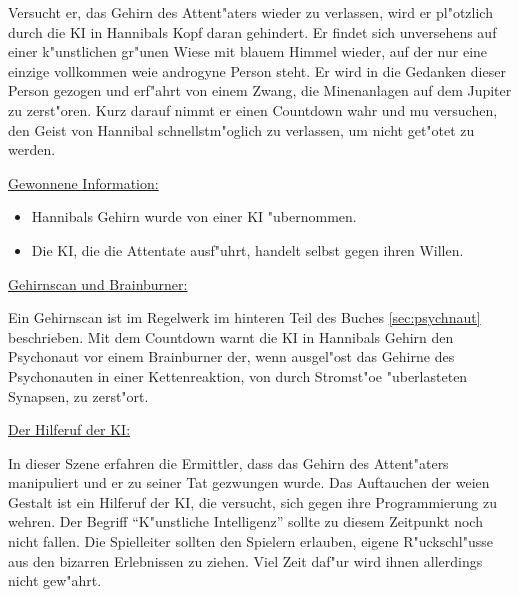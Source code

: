 Versucht er, das Gehirn des Attent"aters wieder zu verlassen, wird er pl"otzlich durch die KI in Hannibals Kopf daran gehindert. Er findet sich unversehens auf einer k"unstlichen gr"unen Wiese mit blauem Himmel wieder, auf der nur eine einzige vollkommen wei\3e androgyne Person steht. Er wird in die Gedanken dieser Person gezogen und erf"ahrt von einem Zwang, die Minenanlagen auf dem Jupiter zu zerst"oren. Kurz darauf nimmt er einen Countdown wahr und mu\3 versuchen, den Geist von Hannibal schnellstm"oglich zu verlassen, um nicht get"otet zu werden.

\begin{remarks}
	\underline{Gewonnene Information:}

	\begin{itemize}
		\item Hannibals Gehirn wurde von einer KI "ubernommen.
		\item  Die KI, die die Attentate ausf"uhrt, handelt selbst gegen ihren Willen.
	\end{itemize}

	\underline{Gehirnscan und Brainburner:}

	Ein Gehirnscan ist im Regelwerk im hinteren Teil des Buches \cref{sec:psychnaut} beschrieben. Mit dem Countdown warnt die KI in Hannibals Gehirn den Psychonaut vor einem Brainburner der, wenn ausgel"ost das Gehirne des Psychonauten in einer Kettenreaktion, von durch Stromst"o\3e "uberlasteten Synapsen, zu zerst"ort.

	\underline{Der Hilferuf der KI:}

	In dieser Szene erfahren die Ermittler, dass das Gehirn des Attent"aters manipuliert und er zu seiner Tat gezwungen wurde. Das Auftauchen der wei\3en Gestalt ist ein Hilferuf der KI, die versucht, sich gegen ihre Programmierung zu wehren. Der Begriff ``K"unstliche Intelligenz'' sollte zu diesem Zeitpunkt noch nicht fallen. Die Spielleiter sollten den Spielern erlauben, eigene R"uckschl"usse aus den bizarren Erlebnissen zu ziehen. Viel Zeit daf"ur wird ihnen allerdings nicht gew"ahrt.
\end{remarks}
